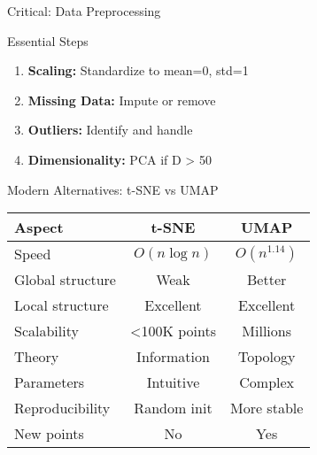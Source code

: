 \begin{frame}{Critical: Data Preprocessing}
\begin{block}{Essential Steps}
\begin{enumerate}
\item \textbf{Scaling:} Standardize to mean=0, std=1
\item \textbf{Missing Data:} Impute or remove
\item \textbf{Outliers:} Identify and handle
\item \textbf{Dimensionality:} PCA if D > 50
\end{enumerate}
\end{block}

\begin{center}
\end{center}

\end{frame}

\begin{frame}{Modern Alternatives: t-SNE vs UMAP}
\begin{center}
\begin{tabular}{l|c|c}
\textbf{Aspect} & \textbf{t-SNE} & \textbf{UMAP} \\
\hline
Speed & $O(n \log n)$ & $O(n^{1.14})$ \\
Global structure & Weak & Better \\
Local structure & Excellent & Excellent \\
Scalability & <100K points & Millions \\
Theory & Information & Topology \\
Parameters & Intuitive & Complex \\
Reproducibility & Random init & More stable \\
New points & No & Yes \\
\end{tabular}
\end{center}

\vspace{0.5cm}
\end{frame}

